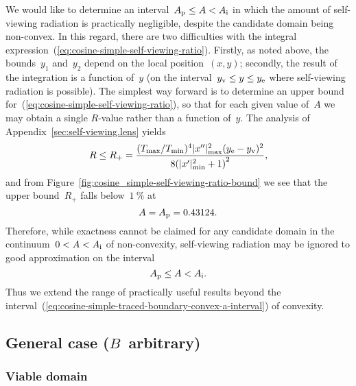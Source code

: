 We would like to determine an interval~$A_{\mathrm{p}} \le A < A_{\mathrm{i}}$
in which the amount of self-viewing radiation is practically negligible,
despite the candidate domain being non-convex.
In this regard,
there are two difficulties
with the integral expression~(\ref{eq:cosine-simple-self-viewing-ratio}).
Firstly, as noted above,
the bounds~$y_1$ and~$y_2$ depend on the local position~$(x, y)$;
secondly, the result of the integration is a function of~$y$
(on the interval~$y_{\mathrm{v}} \le y \le y_{\mathrm{e}}$
where self-viewing radiation is possible).
The simplest way forward is to determine
an upper bound for~(\ref{eq:cosine-simple-self-viewing-ratio}),
so that for each given value of~$A$
we may obtain a single $R$-value rather than a function of~$y$.
The analysis of Appendix~\ref{sec:self-viewing.lens} yields
\begin{equation}
  \savecontent{
    R \le R_+ =
      \frac{
        (T_{\max} / T_{\min})^4
        \abs{x''}_{\max}^2
        (y_\End - y_\view)^2
      }{
        8 \roundbr*{\abs{x'}_{\min}^2 + 1}^2
      }
  }{eq:cosine-simple-self-viewing-ratio-bound},
\end{equation}
and from Figure~\ref{fig:cosine_simple-self-viewing-ratio-bound}
we see that the upper bound~$R_+$ falls below~$\SI{1}{\percent}$ at
\begin{equation}
  A = A_{\mathrm{p}} = 0.43124.
  \label{eq:cosine-simple-traced-boundary-a-practical}
\end{equation}
Therefore, while exactness cannot be claimed for any candidate domain
in the continuum~$0 < A < A_{\mathrm{i}}$ of non-convexity,
self-viewing radiation may be ignored to good approximation
on the interval
\begin{equation}
  A_{\mathrm{p}} \le A < A_{\mathrm{i}}.
  \label{eq:cosine-simple-traced-boundary-practical-a-interval}
\end{equation}
Thus we extend the range of practically useful results
beyond the interval~(\ref{eq:cosine-simple-traced-boundary-convex-a-interval})
of convexity.

\subsection{General case (\texorpdfstring{$B$~arbitrary}{B arbitrary})}
\label{sec:cartesian.cosine.general}

\subsubsection{Viable domain}
\label{sec:cartesian.cosine.general.viable}

